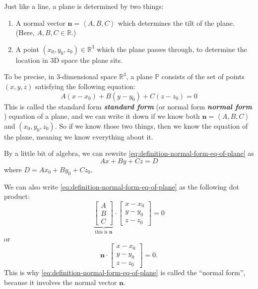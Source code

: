 \documentclass[10pt]{article}
\DeclareRobustCommand{\demph}[1]{%
  \ifmmode
  {\color{Blue}#1}%
  \else
  {\color{Blue}\bfseries\slshape #1}%
  \fi
}
\theoremstyle{definition}
\newcommand{\1}[1]{\textbf{1}_{\left[#1\right]}} %
\def\R{\mathbb{R}} %
\begin{document}
Just like a line, a plane is determined by two things:
\begin{enumerate}
  \item A normal vector $\boldsymbol{n}= \left\langle A,B,C \right\rangle$ which
  determines the tilt of the plane. (Here, $A,B,C\in \R$.)
  \item A point $(x_{0},y_{0},z_{0})\in \R^{3}$ which the plane passes
  through, to determine the location in 3D space the plane sits.
\end{enumerate}
To be precise, in 3-dimensional space $\R^{3}$, a plane $\mathbb{P}$ consists of the set of points $(x,y,z)$ satisfying
the following equation:
\begin{equation}\label{eq:definition-normal-form-eq-of-plane}
  A(x-x_{0}) + B(y-y_{0})+C(z-z_{0})=0
\end{equation}
This is called the \demph{standard form} (or \demph{normal form}) equation of
a plane, and we can write it down if we know both
$\boldsymbol{n}=\left\langle A,B,C \right\rangle $ and $(x_{0},y_{0},z_{0})$.
So if we know those two things, then we know the equation of the plane,
meaning we know everything about it.

By a little bit of algebra, we can rewrite
\cref{eq:definition-normal-form-eq-of-plane} as
\begin{equation*}
  Ax+By+Cz=D
\end{equation*}
where $D = Ax_{0}+By_{0}+Cz_{0}$.

We can also write \cref{eq:definition-normal-form-eq-of-plane} as the following dot product:
\begin{equation*}
  \underbrace{
    \begin{bmatrix}
      A\\B\\C
    \end{bmatrix}
  }_{\text{this is }\boldsymbol{n}} \cdot
  \begin{bmatrix}
    x-x_{0}\\y-y_{0}\\z-z_{0}
  \end{bmatrix}=0
\end{equation*}
or
\begin{equation*}
  \boldsymbol{n}\cdot
  \begin{bmatrix}
    x-x_{0}\\y-y_{0}\\z-z_{0}
  \end{bmatrix}
  =0.
\end{equation*}
This is why \cref{eq:definition-normal-form-eq-of-plane} is called the
``normal form'', because it involves the normal vector $\boldsymbol{n}$.
\end{document}
